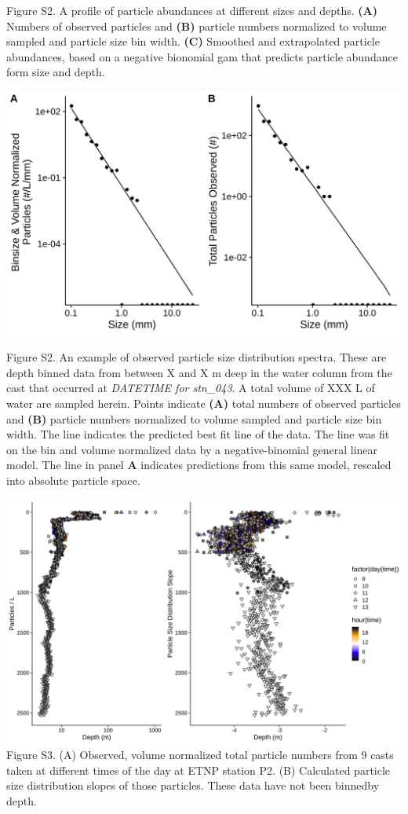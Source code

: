 \documentclass[]{article}
\begin{document}
Figure S2. A profile of particle abundances at different sizes and
depths. \textbf{(A)} Numbers of observed particles and \textbf{(B)}
particle numbers normalized to volume sampled and particle size bin
width. \textbf{(C)} Smoothed and extrapolated particle abundances, based
on a negative bionomial gam that predicts particle abundance form size
and depth.

\includegraphics{../figures/ExamplePSD163m.svg}

Figure S2. An example of observed particle size distribution spectra.
These are depth binned data from between X and X m deep in the water
column from the cast that occurred at \emph{DATETIME for stn\_043}. A
total volume of XXX L of water are sampled herein. Points indicate
\textbf{(A)} total numbers of observed particles and \textbf{(B)}
particle numbers normalized to volume sampled and particle size bin
width. The line indicates the predicted best fit line of the data. The
line was fit on the bin and volume normalized data by a
negative-binomial general linear model. The line in panel \textbf{A}
indicates predictions from this same model, rescaled into absolute
particle space.

\includegraphics{../figures/ParticlesPSDMany.svg} Figure S3. (A)
Observed, volume normalized total particle numbers from 9 casts taken at
different times of the day at ETNP station P2. (B) Calculated particle
size distribution slopes of those particles. These data have not been
binnedby depth.
\end{document}
